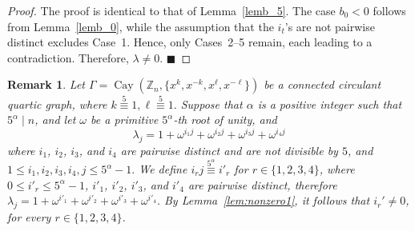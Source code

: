 \documentclass[12pt]{article}
\newtheorem{remA}[propA]{Remark}
\begin{document}
  \begin{proof}
  	The proof is identical to that of Lemma~\ref{lemb_5}. The case $b_0<0$ follows from Lemma~\ref{lemb_0}, while the assumption that the $i_t$'s are not pairwise distinct excludes Case~1. Hence, only Cases~2--5 remain, each leading to a contradiction. Therefore, $\lambda\neq0$.
  	\hfill$\blacksquare$
  \end{proof}
 \begin{remA}\label{rem:lan}
 Let
 $\Gamma=\operatorname{Cay}(\mathbb{Z}_n,\{x^{k},x^{-k},x^{\ell},x^{-\ell}\})$
 be a connected circulant quartic graph, where
 $
k\stackrel{5}{\equiv}1, \ell\stackrel{5}{\equiv}1.
 $
 Suppose that $\alpha$ is a positive integer such that $5^\alpha\mid n$, and let $\omega$ be a primitive $5^\alpha$-th root of unity, and
 \begin{equation}\label{eq:lambdaj}
 	\lambda_j=
 	1+\omega^{i_{1}j}+\omega^{i_{2}j}+\omega^{i_{3}j}+\omega^{i_{4}j}
 \end{equation}	
 where $i_1$, $i_2$, $i_3$, and $i_4$ are pairwise distinct and are not divisible by $5$, and
 $
 1\le i_1,i_2,i_3,i_4,j\le 5^\alpha-1.
 $ We define $i_rj\stackrel{5^\alpha}{\equiv} i'_r$ for $r\in\{1,2,3,4\}$, where $0\le i'_r\le 5^\alpha-1$, $i'_1$, $i'_2$, $i'_3$, and $i'_4$ are pairwise distinct, therefore
 $
 \lambda_j
 =
 1+\omega^{i'_1}
 +\omega^{i'_2}
 +\omega^{i'_3}
 +\omega^{i'_4}.
 $
By Lemma~\ref{lem:nonzero1}, it follows that
$
i_r'\neq0$, for every $r\in\{1,2,3,4\}$.


\end{remA}
\end{document}
